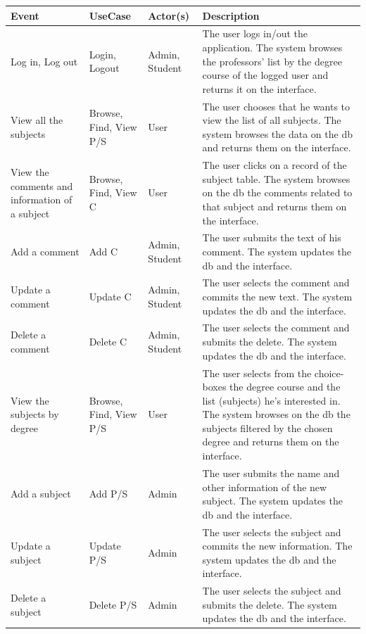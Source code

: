 \documentclass[a4paper]{article}
\begin{document}
\begin{table}[h]
\centering
\begin{tabular}{p{}p{}lp{}}
\hline
\textbf{Event} & \textbf{UseCase} & \textbf{Actor(s)} & \textbf{Description}\\ \hline
Log in, Log out & Login,  Logout & Admin, Student & The user logs in/out the application. The system browses the professors' list by the degree course of the logged user and returns it on the interface.\\ \hline
View all the subjects & Browse, Find, View P/S & User & The user chooses that he wants to view the list of all subjects. The system browses the data on the db and returns them on the interface.\\ \hline
View the comments and information of a subject & Browse, Find, View C & User & The user clicks on a record of the subject table. The system browses on the db the comments related to that subject and returns them on the interface.\\ \hline
Add a comment & Add C & Admin, Student & The user submits the text of his comment. The system updates the db and the interface.\\ \hline
Update a comment & Update C & Admin, Student & The user selects the comment and commits the new text. The system updates the db and the interface.\\ \hline
Delete a comment & Delete C & Admin, Student & The user selects the comment and submits the delete. The system updates the db and the interface.\\ \hline
View the subjects by degree & Browse, Find, View P/S & User & The user selects from the choice-boxes the degree course and the list (subjects) he's interested in. The system browses on the db the subjects filtered by the chosen degree and returns them on the interface.\\ \hline
Add a subject & Add P/S & Admin & The user submits the name and other information of the new subject. The system updates the db and the interface.\\ \hline
Update a subject & Update P/S & Admin & The user selects the subject and commits the new information. The system updates the db and the interface.\\ \hline
Delete a subject & Delete P/S & Admin & The user selects the subject and submits the delete. The system updates the db and the interface.\\ \hline
\end{tabular}
\end{table}
\end{document}

